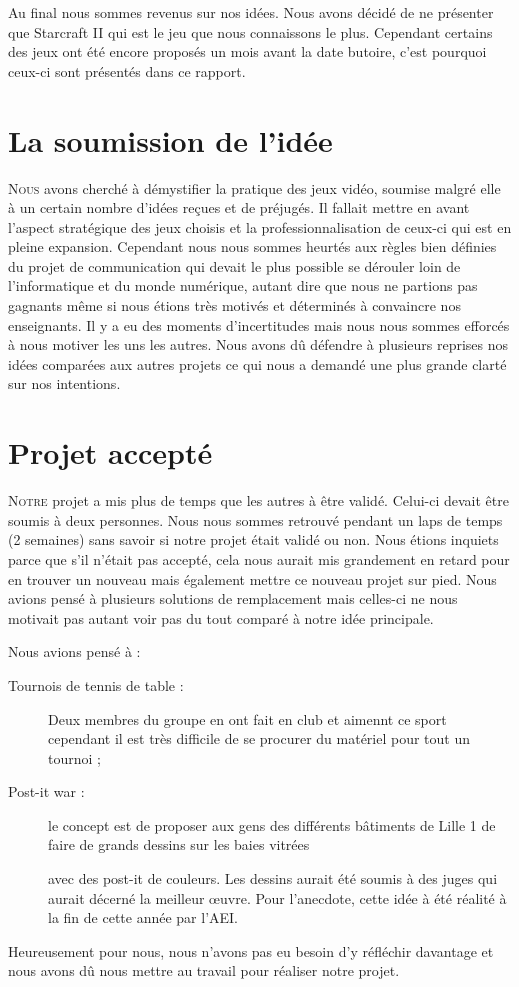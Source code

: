 Au final nous sommes revenus sur nos idées. Nous avons décidé
de ne présenter que Starcraft II qui est le jeu que nous connaissons le
plus. Cependant certains des jeux ont été encore proposés un mois avant
la date butoire, c'est pourquoi ceux-ci sont présentés dans ce rapport.

\section{La soumission de l'idée}%
\label{sec:la_soumission_de_l_idee}

\lettrine{N}{ous} avons cherché à démystifier la pratique des jeux vidéo, 
soumise malgré elle à un certain nombre d'idées reçues et de
préjugés. Il fallait mettre en avant l'aspect stratégique des jeux
choisis et la professionnalisation de ceux-ci qui est en pleine expansion. 
Cependant nous nous sommes heurtés aux règles bien définies du projet de
communication qui devait le plus possible se dérouler loin de
l'informatique et du monde numérique, autant dire que nous ne partions
pas gagnants même si nous étions très motivés et déterminés à convaincre
nos enseignants. Il y a eu des moments d'incertitudes mais nous nous
sommes efforcés à nous motiver les uns les autres. Nous avons dû
défendre à plusieurs reprises nos idées comparées aux autres projets ce
qui nous a demandé une plus grande clarté sur nos intentions.

\section{Projet accepté}%
\label{sec:projet_accepte}

\lettrine{N}{otre} projet a mis plus de temps que les autres à être
validé. Celui-ci devait être soumis à deux personnes. Nous nous sommes
retrouvé pendant un laps de temps (2 semaines) sans savoir si notre
projet était validé ou non. Nous étions inquiets parce que s'il n'était
pas accepté, cela nous aurait mis grandement en retard pour 
en trouver un nouveau mais également mettre ce nouveau projet sur pied. Nous
avions pensé à plusieurs solutions de remplacement mais celles-ci ne nous
motivait pas autant voir pas du tout comparé à notre idée principale.

Nous avions pensé à :

\begin{description}

\item[Tournois de tennis de table :] Deux membres du groupe en ont fait en
club et aimennt ce sport cependant il est très difficile de se procurer du
matériel pour tout un tournoi ;

\item[Post-it war :] le concept est de proposer aux gens des différents
bâtiments de Lille 1 de faire de grands dessins sur les baies vitrées

avec des post-it de couleurs. Les dessins aurait été soumis à des juges
qui aurait décerné la meilleur \oe{}uvre.  Pour l'anecdote, cette idée à
été réalité à la fin de cette année par l'AEI.

\end{description}

Heureusement pour nous, nous n'avons pas eu besoin d'y réfléchir
davantage et nous avons dû nous mettre au travail pour réaliser notre
projet.

